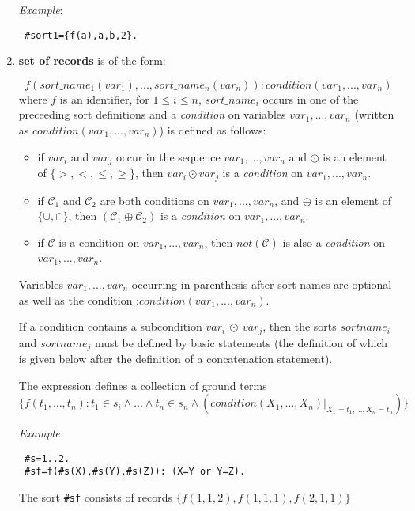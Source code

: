 \documentclass[12pt, letterpaper]{article}
\begin{document}
\begin{enumerate}
\textit{Example}: 
\begin{verbatim}
 #sort1={f(a),a,b,2}.
\end{verbatim}
\item \textbf{set of records} is of the form:

\begin{equation*}
f(sort\_name_1(var_1),..., sort\_name_n(var_n)):
                                     condition(var_1,...,var_n)
\end{equation*}
where $f$ is an identifier, for $ 1\leq i\leq n$, $sort\_name_i$ occurs in one of the preceeding sort definitions and a \textit{condition} on variables $var_1,...,var_n$ (written as $condition(var_1,...,var_n)$) is defined as follows:

\begin{itemize}
\item if $var_i$ and $var_j$ occur in the sequence  $var_1,...,var_n$ and $\odot$ is an element of $\{>,<,\le,\ge\}$, then $var_i \odot var_j$ is a \textit{condition} on   $var_1,...,var_n$.
\item if $\mathcal{C}_1$ and $\mathcal{C}_2$ are both conditions on  $var_1,...,var_n$, and $\oplus$ is an element of  $\{\cup,\cap\}$, then
$(\mathcal{C}_1 \oplus \mathcal{C}_2)$ is a \textit{condition} on  $var_1,...,var_n$.
\item if $\mathcal{C}$ is a  condition on  $var_1,...,var_n$, then $not(\mathcal{C})$ is also a \textit{condition} on  $var_1,...,var_n$.
\end{itemize}
Variables $var_1,...,var_n$ occurring in parenthesis after sort names are optional as well as the condition :$condition(var_1,...,var_n)$.

If a condition contains a subcondition $var_i~\odot~var_j$,  then the sorts  $sortname_i$ and  $sortname_j$ must be defined by basic statements (the definition of which is given below after the definition of a concatenation statement).

The expression defines a collection of ground terms 
\\ $\{f(t_1,\dots,t_n):  t_1 \in s_i \land \dots \land t_n \in s_n \land (condition(X_1,\dots, X_n)|_{X_1 = t_1,\dots,X_n = t_n})\}$

\textit{Example}
\begin{verbatim}
 #s=1..2.
 #sf=f(#s(X),#s(Y),#s(Z)): (X=Y or Y=Z). 
\end{verbatim}

The sort \texttt{\#sf} consists of records $\{f(1,1,2),f(1,1,1),f(2,1,1)\}$




\end{enumerate}
\end{document}
